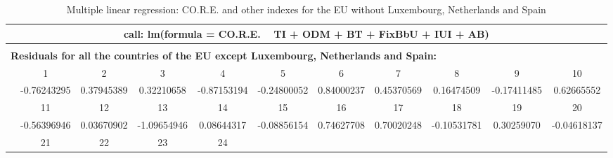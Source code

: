 \documentclass[a4paper, twoside]{report}
\begin{document}
\begin{landscape}
\thispagestyle{empty}
\begin{table}[htbp]
  \centering
   \caption{Multiple linear regression: CO.R.E. and other indexes for the EU without Luxembourg, Netherlands and Spain}
   \tabcolsep=0.60cm
	\renewcommand{\arraystretch}{1.3}
	\begin{adjustbox}{max width=\linewidth}

    \begin{tabular}{lllllllllll}
    \toprule
    \multicolumn{11}{c}{\textbf{call: lm(formula = CO.R.E. ~ TI + ODM + BT + FixBbU + IUI + AB)}} \\
    \midrule
    \multicolumn{11}{c}{} \\
    \midrule
    \multicolumn{11}{l}{\textbf{Residuals for all the countries of the EU except Luxembourg, Netherlands and Spain:}} \\
          & \multicolumn{1}{c}{1} & \multicolumn{1}{c}{2} & \multicolumn{1}{c}{3} & \multicolumn{1}{c}{4} & \multicolumn{1}{c}{5} & \multicolumn{1}{c}{6} & \multicolumn{1}{c}{7} & \multicolumn{1}{c}{8} & \multicolumn{1}{c}{9} & \multicolumn{1}{c}{10} \\
          & \multicolumn{1}{c}{-0.76243295} & \multicolumn{1}{c}{0.37945389} & \multicolumn{1}{c}{0.32210658} & \multicolumn{1}{c}{-0.87153194} & \multicolumn{1}{c}{-0.24800052} & \multicolumn{1}{c}{0.84000237} & \multicolumn{1}{c}{0.45370569 } & \multicolumn{1}{c}{ 0.16474509} & \multicolumn{1}{c}{-0.17411485} & \multicolumn{1}{c}{0.62665552} \\
          & \multicolumn{1}{c}{11} & \multicolumn{1}{c}{12} & \multicolumn{1}{c}{13} & \multicolumn{1}{c}{14} & \multicolumn{1}{c}{15} & \multicolumn{1}{c}{16} & \multicolumn{1}{c}{17} & \multicolumn{1}{c}{18} & \multicolumn{1}{c}{19} & \multicolumn{1}{c}{20} \\
          & \multicolumn{1}{c}{-0.56396946} & \multicolumn{1}{c}{0.03670902} & \multicolumn{1}{c}{-1.09654946} & \multicolumn{1}{c}{ 0.08644317 } & \multicolumn{1}{c}{-0.08856154 } & \multicolumn{1}{c}{ 0.74627708 } & \multicolumn{1}{c}{ 0.70020248} & \multicolumn{1}{c}{-0.10531781} & \multicolumn{1}{c}{ 0.30259070} & \multicolumn{1}{c}{-0.04618137} \\
          & \multicolumn{1}{c}{21} & \multicolumn{1}{c}{22} & \multicolumn{1}{c}{23} & \multicolumn{1}{c}{24} &       &       &       &       &       &  \\

\end{tabular}
\end{adjustbox}
\end{table}
\end{landscape}
\end{document}
